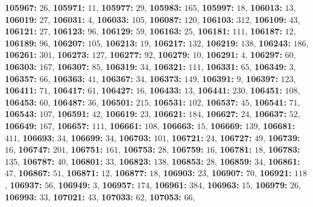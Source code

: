\textsf{\bfseries 105967:} $26$, \textsf{\bfseries 105971:} $11$, \textsf{\bfseries 105977:} $29$, \textsf{\bfseries 105983:} $165$, \textsf{\bfseries 105997:} $18$, \textsf{\bfseries 106013:} $13$, \textsf{\bfseries 106019:} $27$, \textsf{\bfseries 106031:} $4$, \textsf{\bfseries 106033:} $105$, \textsf{\bfseries 106087:} $120$, \textsf{\bfseries 106103:} $312$, \textsf{\bfseries 106109:} $43$, \textsf{\bfseries 106121:} $27$, \textsf{\bfseries 106123:} $96$, \textsf{\bfseries 106129:} $59$, \textsf{\bfseries 106163:} $25$, \textsf{\bfseries 106181:} $111$, \textsf{\bfseries 106187:} $12$, \textsf{\bfseries 106189:} $96$, \textsf{\bfseries 106207:} $105$, \textsf{\bfseries 106213:} $19$, \textsf{\bfseries 106217:} $132$, \textsf{\bfseries 106219:} $138$, \textsf{\bfseries 106243:} $186$, \textsf{\bfseries 106261:} $301$, \textsf{\bfseries 106273:} $127$, \textsf{\bfseries 106277:} $92$, \textsf{\bfseries 106279:} $10$, \textsf{\bfseries 106291:} $4$, \textsf{\bfseries 106297:} $60$, \textsf{\bfseries 106303:} $167$, \textsf{\bfseries 106307:} $85$, \textsf{\bfseries 106319:} $34$, \textsf{\bfseries 106321:} $111$, \textsf{\bfseries 106331:} $65$, \textsf{\bfseries 106349:} $3$, \textsf{\bfseries 106357:} $66$, \textsf{\bfseries 106363:} $41$, \textsf{\bfseries 106367:} $34$, \textsf{\bfseries 106373:} $149$, \textsf{\bfseries 106391:} $9$, \textsf{\bfseries 106397:} $123$, \textsf{\bfseries 106411:} $71$, \textsf{\bfseries 106417:} $61$, \textsf{\bfseries 106427:} $16$, \textsf{\bfseries 106433:} $13$, \textsf{\bfseries 106441:} $230$, \textsf{\bfseries 106451:} $108$, \textsf{\bfseries 106453:} $60$, \textsf{\bfseries 106487:} $36$, \textsf{\bfseries 106501:} $215$, \textsf{\bfseries 106531:} $102$, \textsf{\bfseries 106537:} $45$, \textsf{\bfseries 106541:} $71$, \textsf{\bfseries 106543:} $107$, \textsf{\bfseries 106591:} $42$, \textsf{\bfseries 106619:} $23$, \textsf{\bfseries 106621:} $184$, \textsf{\bfseries 106627:} $24$, \textsf{\bfseries 106637:} $52$, \textsf{\bfseries 106649:} $167$, \textsf{\bfseries 106657:} $111$, \textsf{\bfseries 106661:} $108$, \textsf{\bfseries 106663:} $15$, \textsf{\bfseries 106669:} $139$, \textsf{\bfseries 106681:} $411$, \textsf{\bfseries 106693:} $34$, \textsf{\bfseries 106699:} $34$, \textsf{\bfseries 106703:} $101$, \textsf{\bfseries 106721:} $24$, \textsf{\bfseries 106727:} $49$, \textsf{\bfseries 106739:} $16$, \textsf{\bfseries 106747:} $201$, \textsf{\bfseries 106751:} $161$, \textsf{\bfseries 106753:} $28$, \textsf{\bfseries 106759:} $16$, \textsf{\bfseries 106781:} $18$, \textsf{\bfseries 106783:} $135$, \textsf{\bfseries 106787:} $40$, \textsf{\bfseries 106801:} $33$, \textsf{\bfseries 106823:} $138$, \textsf{\bfseries 106853:} $28$, \textsf{\bfseries 106859:} $34$, \textsf{\bfseries 106861:} $47$, \textsf{\bfseries 106867:} $51$, \textsf{\bfseries 106871:} $12$, \textsf{\bfseries 106877:} $18$, \textsf{\bfseries 106903:} $23$, \textsf{\bfseries 106907:} $70$, \textsf{\bfseries 106921:} $118$, \textsf{\bfseries 106937:} $56$, \textsf{\bfseries 106949:} $3$, \textsf{\bfseries 106957:} $174$, \textsf{\bfseries 106961:} $384$, \textsf{\bfseries 106963:} $15$, \textsf{\bfseries 106979:} $26$, \textsf{\bfseries 106993:} $33$, \textsf{\bfseries 107021:} $43$, \textsf{\bfseries 107033:} $62$, \textsf{\bfseries 107053:} $66$, 
